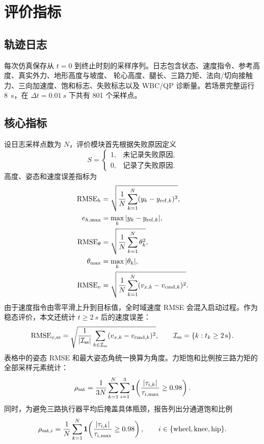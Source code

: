 \documentclass[UTF8,12pt,a4paper,fontset=none]{ctexart}
\begin{document}
\section{评价指标}

\subsection{轨迹日志}
每次仿真保存从 $t=0$ 到终止时刻的采样序列。日志包含状态、速度指令、参考高度、真实外力、地形高度与坡度、
轮心高度、腿长、三路力矩、法向/切向接触力、三向加速度、饱和标志、失败标志以及 WBC/QP 诊断量。若场景完整运行
\SI{8}{s}，在 $\Delta t=\SI{0.01}{s}$ 下共有 801 个采样点。

\subsection{核心指标}
设日志采样点数为 $N$，评价模块首先根据失败原因定义
\begin{equation}
S=\begin{cases}
1,&\text{未记录失败原因},\\
0,&\text{记录了失败原因}.
\end{cases}
\end{equation}
高度、姿态和速度误差指标为
\begin{align}
\mathrm{RMSE}_h&=\sqrt{\frac{1}{N}\sum_{k=1}^{N}(y_k-y_{{\rm ref},k})^2},\\
e_{h,\max}&=\max_k|y_k-y_{{\rm ref},k}|,\\
\mathrm{RMSE}_\theta&=\sqrt{\frac{1}{N}\sum_{k=1}^{N}\theta_k^2},\\
\theta_{\max}&=\max_k|\theta_k|,\\
\mathrm{RMSE}_v&=\sqrt{\frac{1}{N}\sum_{k=1}^{N}(v_{x,k}-v_{{\rm cmd},k})^2}.
\end{align}
由于速度指令由零平滑上升到目标值，全时域速度 RMSE 会混入启动过程。作为稳态评价，本文还统计
$t\ge\SI{2}{s}$ 后的速度误差：
\begin{equation}
\mathrm{RMSE}_{v,\rm ss}=
\sqrt{\frac{1}{|\mathcal I_{\rm ss}|}\sum_{k\in\mathcal I_{\rm ss}}
(v_{x,k}-v_{{\rm cmd},k})^2},\qquad
\mathcal I_{\rm ss}=\{k:t_k\ge\SI{2}{s}\}.
\end{equation}
表格中的姿态 RMSE 和最大姿态角统一换算为角度。力矩饱和比例按三路力矩的全部采样元素统计：
\begin{equation}
\rho_{\rm sat}=
\frac{1}{3N}\sum_{k=1}^{N}\sum_{i=1}^{3}
\mathbf 1\!\left(\frac{|\tau_{i,k}|}{\tau_{i,\max}}\ge0.98\right).
\end{equation}
同时，为避免三路执行器平均后掩盖具体瓶颈，报告列出分通道饱和比例
\begin{equation}
\rho_{{\rm sat},i}=
\frac{1}{N}\sum_{k=1}^{N}
\mathbf 1\!\left(\frac{|\tau_{i,k}|}{\tau_{i,\max}}\ge0.98\right),
\qquad i\in\{\text{wheel},\text{knee},\text{hip}\}.
\end{equation}
\end{document}
